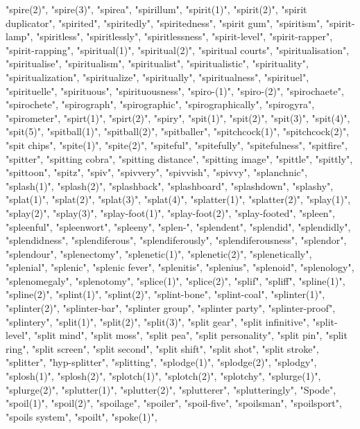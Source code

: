 "spire(2)",
"spire(3)",
"spirea",
"spirillum",
"spirit(1)",
"spirit(2)",
"spirit duplicator",
"spirited",
"spiritedly",
"spiritedness",
"spirit gum",
"spiritism",
"spirit-lamp",
"spiritless",
"spiritlessly",
"spiritlessness",
"spirit-level",
"spirit-rapper",
"spirit-rapping",
"spiritual(1)",
"spiritual(2)",
"spiritual courts",
"spiritualisation",
"spiritualise",
"spiritualism",
"spiritualist",
"spiritualistic",
"spirituality",
"spiritualization",
"spiritualize",
"spiritually",
"spiritualness",
"spirituel",
"spirituelle",
"spirituous",
"spirituousness",
"spiro-(1)",
"spiro-(2)",
"spirochaete",
"spirochete",
"spirograph",
"spirographic",
"spirographically",
"spirogyra",
"spirometer",
"spirt(1)",
"spirt(2)",
"spiry",
"spit(1)",
"spit(2)",
"spit(3)",
"spit(4)",
"spit(5)",
"spitball(1)",
"spitball(2)",
"spitballer",
"spitchcock(1)",
"spitchcock(2)",
"spit chips",
"spite(1)",
"spite(2)",
"spiteful",
"spitefully",
"spitefulness",
"spitfire",
"spitter",
"spitting cobra",
"spitting distance",
"spitting image",
"spittle",
"spittly",
"spittoon",
"spitz",
"spiv",
"spivvery",
"spivvish",
"spivvy",
"splanchnic",
"splash(1)",
"splash(2)",
"splashback",
"splashboard",
"splashdown",
"splashy",
"splat(1)",
"splat(2)",
"splat(3)",
"splat(4)",
"splatter(1)",
"splatter(2)",
"splay(1)",
"splay(2)",
"splay(3)",
"splay-foot(1)",
"splay-foot(2)",
"splay-footed",
"spleen",
"spleenful",
"spleenwort",
"spleeny",
"splen-",
"splendent",
"splendid",
"splendidly",
"splendidness",
"splendiferous",
"splendiferously",
"splendiferousness",
"splendor",
"splendour",
"splenectomy",
"splenetic(1)",
"splenetic(2)",
"splenetically",
"splenial",
"splenic",
"splenic fever",
"splenitis",
"splenius",
"splenoid",
"splenology",
"splenomegaly",
"splenotomy",
"splice(1)",
"splice(2)",
"splif",
"spliff",
"spline(1)",
"spline(2)",
"splint(1)",
"splint(2)",
"splint-bone",
"splint-coal",
"splinter(1)",
"splinter(2)",
"splinter-bar",
"splinter group",
"splinter party",
"splinter-proof",
"splintery",
"split(1)",
"split(2)",
"split(3)",
"split gear",
"split infinitive",
"split-level",
"split mind",
"split moss",
"split pea",
"split personality",
"split pin",
"split ring",
"split screen",
"split second",
"split shift",
"split shot",
"split stroke",
"splitter",
"hyp-splitter",
"splitting",
"splodge(1)",
"splodge(2)",
"splodgy",
"splosh(1)",
"splosh(2)",
"splotch(1)",
"splotch(2)",
"splotchy",
"splurge(1)",
"splurge(2)",
"splutter(1)",
"splutter(2)",
"splutterer",
"splutteringly",
"Spode",
"spoil(1)",
"spoil(2)",
"spoilage",
"spoiler",
"spoil-five",
"spoilsman",
"spoilsport",
"spoils system",
"spoilt",
"spoke(1)",
